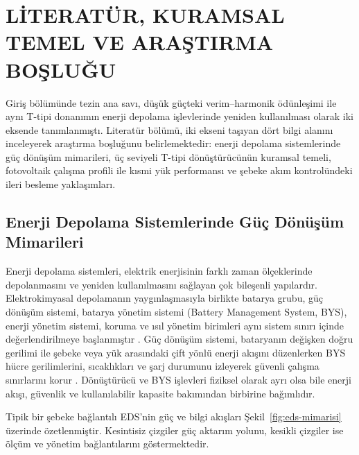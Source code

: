 \chapter{LİTERATÜR, KURAMSAL TEMEL VE ARAŞTIRMA BOŞLUĞU}
\label{chap:literatur}

Giriş bölümünde tezin ana savı, düşük güçteki verim--harmonik ödünleşimi ile aynı T-tipi donanımın enerji depolama işlevlerinde yeniden kullanılması olarak iki eksende tanımlanmıştı. Literatür bölümü, iki ekseni taşıyan dört bilgi alanını inceleyerek araştırma boşluğunu belirlemektedir: enerji depolama sistemlerinde güç dönüşüm mimarileri, üç seviyeli T-tipi dönüştürücünün kuramsal temeli, fotovoltaik çalışma profili ile kısmi yük performansı ve şebeke akım kontrolündeki ileri besleme yaklaşımları.

\section{Enerji Depolama Sistemlerinde Güç Dönüşüm Mimarileri}

Enerji depolama sistemleri, elektrik enerjisinin farklı zaman ölçeklerinde depolanmasını ve yeniden kullanılmasını sağlayan çok bileşenli yapılardır. Elektrokimyasal depolamanın yaygınlaşmasıyla birlikte batarya grubu, güç dönüşüm sistemi, batarya yönetim sistemi (Battery Management System, BYS), enerji yönetim sistemi, koruma ve ısıl yönetim birimleri aynı sistem sınırı içinde değerlendirilmeye başlanmıştır \citep{Chen2009,Aneke2016,Hannan2017}. Güç dönüşüm sistemi, bataryanın değişken doğru gerilimi ile şebeke veya yük arasındaki çift yönlü enerji akışını düzenlerken BYS hücre gerilimlerini, sıcaklıkları ve şarj durumunu izleyerek güvenli çalışma sınırlarını korur \citep{Plett2015,Khan2024}. Dönüştürücü ve BYS işlevleri fiziksel olarak ayrı olsa bile enerji akışı, güvenlik ve kullanılabilir kapasite bakımından birbirine bağımlıdır.

Tipik bir şebeke bağlantılı EDS'nin güç ve bilgi akışları Şekil~\ref{fig:eds-mimarisi} üzerinde özetlenmiştir. Kesintisiz çizgiler güç aktarım yolunu, kesikli çizgiler ise ölçüm ve yönetim bağlantılarını göstermektedir.

